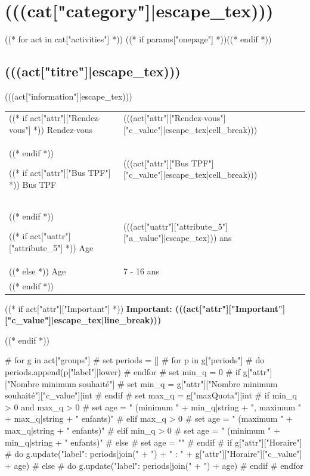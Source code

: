 \documentclass [parskip=full, paper=a4paper]{scrbook}
\begin{document}
\chapter{(((cat["category"]|escape_tex)))}

((* for act in cat["activities"] *))
((* if params["onepage"] *))\newpage((* endif *))
\begin{minipage}[t]{\textwidth}%
\section{(((act["titre"]|escape_tex)))}

(((act["information"]|escape_tex)))
\medskip

\begin{tabulary}{0.9\textwidth}{p{2.5cm}|L}

((* if act["attr"]["Rendez-vous"] *))
Rendez-vous & (((act["attr"]["Rendez-vous"]["c_value"]|escape_tex|cell_break))) \\
((* endif *))

((* if act["attr"]["Bus TPF"] *))
Bus TPF & (((act["attr"]["Bus TPF"]["c_value"]|escape_tex|cell_break))) \\
((* endif *))

((* if act["uattr"]["attribute_5"] *))
Age & (((act["uattr"]["attribute_5"]["a_value"]|escape_tex))) ans \\
((* else *))
Age & 7 - 16 ans \\
((* endif *))

\end{tabulary}

((* if act["attr"]["Important"] *))
\medskip
\textbf{Important: (((act["attr"]["Important"]["c_value"]|escape_tex|line_break)))}

((* endif *))

# for g in act["groups"]
#   set periods = []
#   for p in g["periods"]
#     do periods.append(p["label"]|lower)
#   endfor
#   set min_q = 0
#   if g["attr"]["Nombre minimum souhaité"]
#     set min_q = g["attr"]["Nombre minimum souhaité"]["c_value"]|int
#   endif
#   set max_q = g["maxQuota"]|int
#   if min_q > 0 and max_q > 0
#     set age = " (minimum " + min_q|string + ", maximum " + max_q|string + " enfants)"
#   elif max_q > 0
#     set age = " (maximum " + max_q|string + " enfants)"
#   elif min_q > 0
#     set age = " (minimum " + min_q|string + " enfants)"
#   else
#     set age = ""
#   endif
#   if g["attr"]["Horaire"]
#     do g.update({"label": periods|join(" + ") + " : " + g["attr"]["Horaire"]["c_value"] + age})
#   else
#     do g.update({"label": periods|join(" + ") + age})
#   endif
# endfor


\end{minipage}
\end{document}

